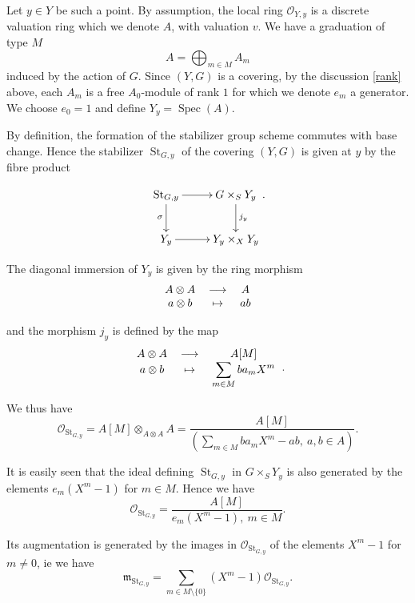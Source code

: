 \documentclass{amsart}
\theoremstyle{definition}
\theoremstyle{remark}
\begin{document}
Let $y \in Y$ be such a point. By assumption, the local ring ${{\mathcal O}}_{Y,y}$ is a discrete valuation ring which we denote $A$, with valuation $v$. We have a graduation of type $M$ \[ A = \displaystyle\bigoplus_{m \in M} A_m \] induced by the action of $G$. Since $(Y,G)$ is a covering, by the discussion \ref{rank} above, each $A_m$ is a free $A_0$-module of rank $1$ for which we denote $e_m$ a generator. We choose $e_0 = 1$ and define $Y_y = \operatorname{Spec}(A)$.   

By definition, the formation of the stabilizer group scheme commutes with base change. Hence the stabilizer $\operatorname{St}_{G,y}$ of the covering $(Y,G)$ is given at $y$ by the fibre product 

\[ \xymatrix{ \operatorname{St}_{G,y} \ar[r] \ar[d]_\sigma & G \times_S Y_y \ar[d]^{j_y} \\
Y_y \ar[r] & Y_y \times_X Y_y }. \]

The diagonal immersion of $Y_y$ is given by the ring morphism \[ \begin{tabular}{ccc}

$A \otimes A$ & ${\longrightarrow}$ & $A$ \\ 

$a \otimes b$ & $\mapsto$ & $ab$ \\ 
\end{tabular} \]
  
and the morphism $j_y$ is defined by the map 
\[ \begin{tabular}{ccc}

$A \otimes A$ & ${\longrightarrow}$ & $A[M]$ \\  
$a \otimes b$ & $\mapsto$ & $\displaystyle\sum_{m \in M} ba_mX^m$ \\ 
 
\end{tabular} .\]
 

We thus have  \[ {{\mathcal O}}_{\operatorname{St}_{G,y}} = A[M] \otimes_{A\otimes A} A  = \frac{A[M]}{ \left( \displaystyle\sum_{m \in M} ba_mX^m - ab, \ a,b \in A \right)}. \]
 
It is easily seen that the ideal defining $\operatorname{St}_{G,y}$ in $G \times_S Y_y$ is also generated by the elements $e_m(X^m-1)$ for $m \in M$. Hence we have 
 \[ {{\mathcal O}}_{\operatorname{St}_{G,y}}  = \frac{A[M]}{e_m(X^m - 1), \ m \in M}. \]

Its augmentation is generated by the images in ${{\mathcal O}}_{\operatorname{St}_{G,y}}$ of the elements $X^m - 1$ for $m \neq 0$, ie we have  \[ {{\mathfrak m}}_{\operatorname{St}_{G,y}} = \displaystyle\sum_{m \in M \setminus \{0\}} (X^m -1) {{\mathcal O}}_{\operatorname{St}_{G,y}}. \]
\end{document}
